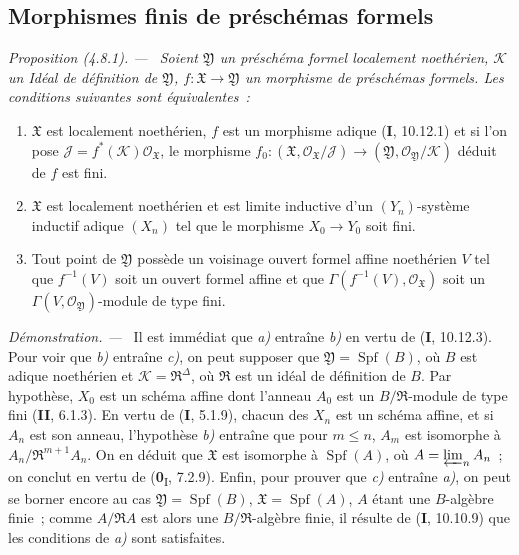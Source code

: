 \documentclass[10pt,oneside]{book}
\newcommand{\oldpage}[2][]{%
  \setcounter{footnote}{0}%
  \marginpar{\scriptsize\textbf{#1}~|~#2}\ignorespaces}
\newenvironment{proposition}[1][]{%
  \par\medskip\noindent\itshape Proposition (#1). ---\ }{\par}
\newenvironment{proof}{%
  \par\medskip\noindent\textit{Démonstration. ---\ }}{\par}
\begin{document}
\subsection{Morphismes finis de préschémas formels}

\begin{proposition}[4.8.1]
\label{III.4.8.1-fr}
Soient $\mathfrak Y$ un préschéma formel localement noethérien, $\mathcal K$ un
Idéal de définition de $\mathfrak Y$, $f:\mathfrak X\to\mathfrak Y$ un
morphisme de préschémas formels. Les conditions suivantes sont équivalentes~:
\begin{enumerate}
\item[a)] $\mathfrak X$ est localement noethérien, $f$ est un morphisme adique
  \textup{(\textbf{I}, 10.12.1)} et si l'on pose
  $\mathcal J=f^*(\mathcal K)\mathcal O_{\mathfrak X}$, le morphisme
  $f_0:(\mathfrak X,\mathcal O_{\mathfrak X}/\mathcal J)
  \longrightarrow
  (\mathfrak Y,\mathcal O_{\mathfrak Y}/\mathcal K)$
  déduit de $f$ est fini.
\item[b)] $\mathfrak X$ est localement noethérien et est limite inductive d'un
  $(Y_n)$-système inductif adique $(X_n)$ tel que le morphisme
  $X_0\to Y_0$ soit fini.
\item[c)] Tout point de $\mathfrak Y$ possède un voisinage ouvert formel affine
  noethérien $V$ tel que $f^{-1}(V)$ soit un ouvert formel affine et que
  $\Gamma(f^{-1}(V),\mathcal O_{\mathfrak X})$ soit un
  $\Gamma(V,\mathcal O_{\mathfrak Y})$-module de type fini.
\end{enumerate}
\end{proposition}

\begin{proof}
Il est immédiat que \emph{a)} entraîne \emph{b)} en vertu de (\textbf{I}, 10.12.3). Pour voir que \emph{b)}
entraîne \emph{c)}, on peut supposer que
$\mathfrak Y=\operatorname{Spf}(B)$, où $B$ est adique noethérien et
$\mathcal K=\mathfrak R^\Delta$, où $\mathfrak R$ est un idéal de définition
de $B$. Par hypothèse, $X_0$ est un schéma affine dont l'anneau $A_0$ est un
$B/\mathfrak R$-module de type fini (\textbf{II}, 6.1.3). En vertu de (\textbf{I}, 5.1.9), chacun
des $X_n$ est un schéma affine, et si $A_n$ est son anneau, l'hypothèse \emph{b)}
entraîne que pour $m\leq n$, $A_m$ est isomorphe à
$A_n/\mathfrak R^{m+1}A_n$. On en déduit que $\mathfrak X$ est isomorphe à
$\operatorname{Spf}(A)$, où $A=\varprojlim_n A_n$~; on conclut en vertu de
(\textbf{0}\textsubscript{I}, 7.2.9). Enfin, pour prouver que \emph{c)}
\oldpage[III]{147}
entraîne \emph{a)}, on peut se borner encore au cas
$\mathfrak Y=\operatorname{Spf}(B)$, $\mathfrak X=\operatorname{Spf}(A)$,
$A$ étant une $B$-algèbre finie~; comme $A/\mathfrak RA$ est alors une
$B/\mathfrak R$-algèbre finie, il résulte de (\textbf{I}, 10.10.9) que les conditions
de \emph{a)} sont satisfaites.
\end{proof}
\end{document}
